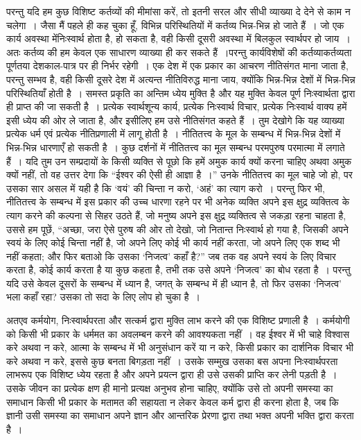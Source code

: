 परन्तु यदि हम कुछ विशिष्ट कर्तव्यों की मीमांसा करें, तो इतनी सरल और सीधी व्याख्या दे देने से काम न चलेगा~। जैसा मैं पहले ही कह चुका हूँ, विभिन्न परिस्थितियों में कर्तव्य भिन्न-भिन्न हो जाते हैं~। जो एक कार्य अवस्था में\break निःस्वार्थ होता है, हो सकता है, वही किसी दूसरी अवस्था में बिलकुल स्वार्थपर हो जाय~। अतः कर्तव्य की हम केवल एक साधारण व्याख्या ही कर सकते हैं~।\break परन्तु कार्यविशेषों की कर्तव्याकर्तव्यता पूर्णतया देशकाल-पात्र पर ही निर्भर रहेगी~। एक देश में एक प्रकार का आचरण नीतिसंगत माना जाता है, परन्तु सम्भव है, वही किसी दूसरे देश में अत्यन्त नीतिविरुद्ध माना जाय, क्योंकि भिन्न-भिन्न देशों में भिन्न-भिन्न परिस्थितियाँ होती है~। समस्त प्रकृति का अन्तिम ध्येय मुक्ति है और यह मुक्ति केवल पूर्ण निःस्वार्थता द्वारा ही प्राप्त की जा सकती है~। प्रत्येक स्वार्थशून्य कार्य, प्रत्येक निःस्वार्थ विचार, प्रत्येक निःस्वार्थ वाक्य हमें इसी ध्येय की ओर ले जाता है, और इसीलिए हम उसे नीतिसंगत कहते हैं~। तुम देखोगे कि यह व्याख्या प्रत्येक धर्म एवं प्रत्येक नीतिप्रणाली में लागू होती है~। नीतितत्त्व के मूल के सम्बन्ध में भिन्न-भिन्न देशों में भिन्न-भिन्न धारणाएँ हो सकती है~। कुछ दर्शनों में नीतितत्त्व का मूल सम्बन्ध परमपुरुष परमात्मा में लगाते हैं~। यदि तुम उन सम्प्रदायों के किसी व्यक्ति से पूछो कि हमें अमुक कार्य क्यों करना चाहिए अथवा अमुक क्यों नहीं, तो वह उत्तर देगा कि “ईश्वर की ऐसी ही आज्ञा है~।” उनके नीतितत्त्व का मूल चाहे जो हो, पर उसका सार असल में यही है कि ‘वयं’ की चिन्ता न करो, ‘अहं’ का त्याग करो~। परन्तु फिर भी, नीतितत्त्व के सम्बन्ध में इस प्रकार की उच्च धारणा रहने पर भी अनेक व्यक्ति अपने इस क्षुद्र व्यक्तित्व के त्याग करने की कल्पना से सिहर उठते हैं, जो मनुष्य अपने इस क्षुद्र व्यक्तित्व से जकड़ा रहना चाहता है, उससे हम पूछें, “अच्छा, जरा ऐसे पुरुष की ओर तो देखो, जो नितान्त निःस्वार्थ हो गया है, जिसकी अपने स्वयं के लिए कोई चिन्ता नहीं है, जो अपने लिए कोई भी कार्य नहीं करता, जो अपने लिए एक शब्द भी नहीं कहता; और फिर बताओ कि उसका ‘निजत्व’ कहाँ है?” जब तक वह अपने स्वयं के लिए विचार करता है, कोई कार्य करता है या कुछ कहता है, तभी तक उसे अपने ‘निजत्व’ का बोध रहता है~। परन्तु यदि उसे केवल दूसरों के सम्बन्ध में ध्यान है, जगत् के सम्बन्ध में ही ध्यान है, तो फिर उसका ‘निजत्व’ भला कहाँ रहा? उसका तो सदा के लिए लोप हो चुका है~।

अतएव कर्मयोग, निःस्वार्थपरता और सत्कर्म द्वारा मुक्ति लाभ करने की एक विशिष्ट प्रणाली है~। कर्मयोगी को किसी भी प्रकार के धर्ममत का अवलम्बन करने की आवश्यकता नहीं~। वह ईश्वर में भी चाहे विश्वास करे अथवा न करे, आत्मा के सम्बन्ध में भी अनुसंधान करें या न करे, किसी प्रकार का दार्शनिक विचार भी करे अथवा न करे, इससे कुछ बनता बिगड़ता नहीं~। उसके सम्मुख उसका बस अपना निःस्वार्थपरता लाभरूप एक विशिष्ट ध्येय रहता है और अपने प्रयत्न द्वारा ही उसे उसकी प्राप्ति कर लेनी पड़ती है~। उसके जीवन का प्रत्येक क्षण ही मानो प्रत्यक्ष अनुभव होना चाहिए, क्योंकि उसे तो अपनी समस्या का समाधान किसी भी प्रकार के मतामत की सहायता न लेकर केवल कर्म द्वारा ही करना होता है, जब कि ज्ञानी उसी समस्या का समाधान अपने ज्ञान और आन्तरिक प्रेरणा द्वारा तथा भक्त अपनी भक्ति द्वारा करता है~।

